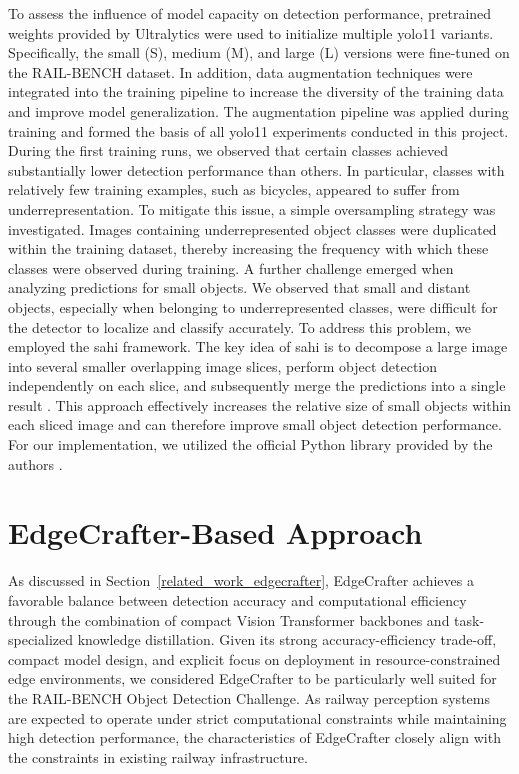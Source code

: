 To assess the influence of model capacity on detection performance, pretrained weights provided by Ultralytics were used to initialize multiple \acrshort{yolo}11 variants. Specifically, the small (S), medium (M), and large (L) versions were fine-tuned on the RAIL-BENCH dataset. In addition, data augmentation techniques were integrated into the training pipeline to increase the diversity of the training data and improve model generalization. The augmentation pipeline was applied during training and formed the basis of all \acrshort{yolo}11 experiments conducted in this project. During the first training runs, we observed that certain classes achieved substantially lower detection performance than others. In particular, classes with relatively few training examples, such as bicycles, appeared to suffer from underrepresentation. To mitigate this issue, a simple oversampling strategy was investigated. Images containing underrepresented object classes were duplicated within the training dataset, thereby increasing the frequency with which these classes were observed during training. A further challenge emerged when analyzing predictions for small objects. We observed that small and distant objects, especially when belonging to underrepresented classes, were difficult for the detector to localize and classify accurately. To address this problem, we employed the \acrfull{sahi} framework. The key idea of \acrshort{sahi} is to decompose a large image into several smaller overlapping image slices, perform object detection independently on each slice, and subsequently merge the predictions into a single result \cite{sahi}. This approach effectively increases the relative size of small objects within each sliced image and can therefore improve small object detection performance. For our implementation, we utilized the official Python library provided by the authors \cite{sahi_library}.


\section{EdgeCrafter-Based Approach}

As discussed in Section~\ref{related_work_edgecrafter}, EdgeCrafter achieves a favorable balance between detection accuracy and computational efficiency through the combination of compact Vision Transformer backbones and task-specialized knowledge distillation. Given its strong accuracy-efficiency trade-off, compact model design, and explicit focus on deployment in resource-constrained edge environments, we considered EdgeCrafter to be particularly well suited for the RAIL-BENCH Object Detection Challenge. As railway perception systems are expected to operate under strict computational constraints while maintaining high detection performance, the characteristics of EdgeCrafter closely align with the constraints in existing railway infrastructure.

